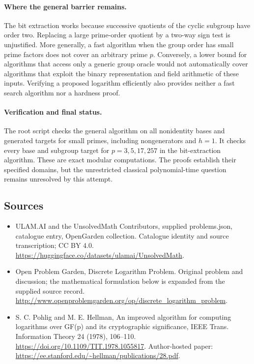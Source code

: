 \documentclass[11pt,a4paper]{article}
\begin{document}
\paragraph{Where the general barrier remains.}
The bit extraction works because successive quotients
of the cyclic subgroup have order two. Replacing a
large prime-order quotient by a two-way sign test is
unjustified. More generally, a fast algorithm when
the group order has small prime factors does not
cover an arbitrary prime $p$. Conversely, a lower
bound for algorithms that access only a generic
group oracle would not automatically cover algorithms
that exploit the binary representation and field
arithmetic of these inputs. Verifying a proposed
logarithm efficiently also provides neither a fast
search algorithm nor a hardness proof.

\paragraph{Verification and final status.}
The root script checks the general algorithm on
all nonidentity bases and generated targets for
small primes, including nongenerators and $h=1$.
It checks every base and subgroup target for
$p=3,5,17,257$ in the bit-extraction algorithm.
These are exact modular computations. The proofs
establish their specified domains, but the unrestricted
classical polynomial-time question remains unresolved
by this attempt.

\subsection{Sources}
\begin{itemize}
\item[S1] ULAM.AI and the UnsolvedMath Contributors, supplied problems.json, catalogue entry, OpenGarden collection. Catalogue identity and source transcription; CC BY 4.0.
\url{https://huggingface.co/datasets/ulamai/UnsolvedMath}.
\item[S2] Open Problem Garden, Discrete Logarithm Problem. Original problem and discussion; the mathematical formulation below is expanded from the supplied source record.
\url{http://www.openproblemgarden.org/op/discrete_logarithm_problem}.

\item[R1] S. C. Pohlig and M. E. Hellman, An improved algorithm for
computing logarithms over GF(p) and its cryptographic significance,
IEEE Trans. Information Theory 24 (1978), 106--110.
\url{https://doi.org/10.1109/TIT.1978.1055817}.
Author-hosted paper: \url{https://ee.stanford.edu/~hellman/publications/28.pdf}.

\end{itemize}
\end{document}
